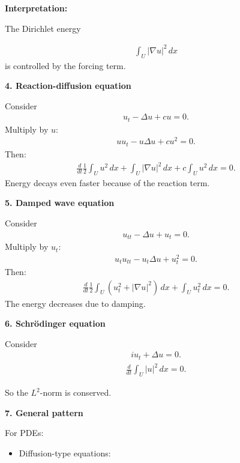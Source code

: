 \documentclass[12pt,a4paper]{report}
\begin{document}
\begin{description}
\begin{description}
\textbf{Interpretation:}

The Dirichlet energy

\begin{align*}
\int_U |\nabla u|^2\,dx
\end{align*}
is controlled by the forcing term.

\item \textbf{4. Reaction-diffusion equation}

Consider
\begin{align*}
u_t-\Delta u+cu=0.
\end{align*}
Multiply by $u$:
\begin{align*}
uu_t-u\Delta u+cu^2=0.
\end{align*}
Then:
\begin{align*}
\boxed{
\frac{d}{dt}\frac12\int_U u^2\,dx + \int_U |\nabla u|^2\,dx + c\int_U u^2\,dx = 0.
}
\end{align*}
Energy decays even faster because of the reaction term.

\item \textbf{5. Damped wave equation}

Consider
\begin{align*}
u_{tt}-\Delta u+u_t=0.
\end{align*}
Multiply by $u_t$:
\begin{align*}
u_tu_{tt}-u_t\Delta u+u_t^2=0.
\end{align*}
Then:
\begin{align*}
\boxed{
\frac{d}{dt}\frac12\int_U (u_t^2+|\nabla u|^2)\,dx + \int_U u_t^2\,dx = 0.
}
\end{align*}
The energy decreases due to damping.

\item \textbf{6. Schrödinger equation}

Consider
\begin{align*}
iu_t+\Delta u=0.
\end{align*}
\begin{align*}
\boxed{
\frac{d}{dt}\int_U |u|^2\,dx=0.
}
\end{align*}

So the $L^2$-norm is conserved.

\item \textbf{7. General pattern}

For PDEs:

	\begin{itemize}

    \item Diffusion-type equations:


\end{itemize}
\end{description}
\end{description}
\end{document}
